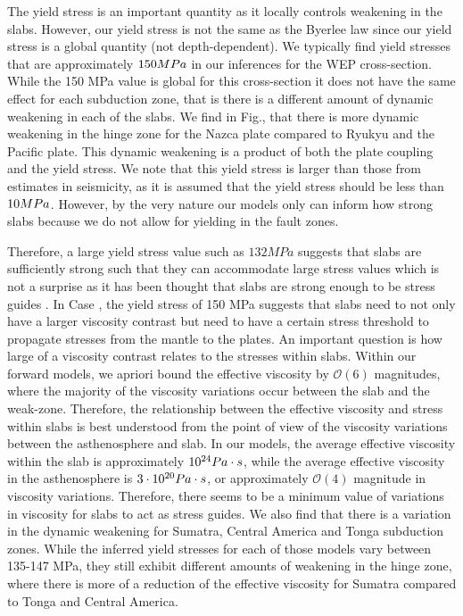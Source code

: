 \documentclass[12pt]{article}
\begin{document}
  The yield stress is an important quantity as it locally controls weakening in the slabs. However, our yield stress is not the same as the Byerlee law since our yield stress is a global quantity (not depth-dependent). We typically find yield stresses that are approximately $150 \space MPa$ in our inferences for the WEP cross-section. While the 150 MPa value is global for this cross-section it does not have the same effect for each subduction zone, that is there is a different amount of dynamic weakening in each of the slabs. We find in Fig., that there is more dynamic weakening in the hinge zone for the Nazca plate compared to Ryukyu and the Pacific plate. This dynamic weakening is a product of both the plate coupling and the yield stress. We note that this yield stress is larger than those from estimates in seismicity, as it is assumed that the yield stress should be less than $10 \space MPa$. However, by the very nature our models only can inform how strong slabs because we do not allow for yielding in the fault zones.
  
  Therefore, a large yield stress value such as $132 MPa$ suggests that slabs are sufficiently strong such that they can accommodate large stress values which is not a surprise as it has been thought that slabs are strong enough to be stress guides \citep{Stadler27082010}. In Case , the yield stress of 150 MPa suggests that slabs need to not only have a larger viscosity contrast but need to have a certain stress threshold to propagate stresses from the mantle to the plates. An important question is how large of a viscosity contrast relates to the stresses within slabs. Within our forward models, we apriori bound the effective viscosity by $\mathcal{O}(6)$ magnitudes, where the majority of the viscosity variations occur between the slab and the weak-zone. Therefore, the relationship between the effective viscosity and stress within slabs is best understood from the point of view of the viscosity variations between the asthenosphere and slab. In our models, the average effective viscosity within the slab is approximately $10^{24}\space Pa\cdot s$, while the average effective viscosity in the asthenosphere is $3\cdot 10^{20}\space Pa\cdot s$, or approximately $\mathcal{O}(4)$ magnitude in viscosity variations. Therefore, there seems to be a minimum value of variations in viscosity for slabs to act as stress guides.   We also find that there is a variation in the dynamic weakening for Sumatra, Central America and Tonga subduction zones. While the inferred yield stresses for each of those models vary between 135-147 MPa, they still exhibit different amounts of weakening in the hinge zone, where there is more of a reduction of the effective viscosity for Sumatra compared to Tonga and Central America.
  
\end{document}
